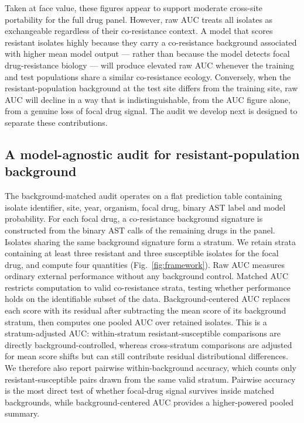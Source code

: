 \documentclass[11pt]{article}
\begin{document}
Taken at face value, these figures appear to support moderate cross-site portability for the full drug panel. However, raw AUC treats all isolates as exchangeable regardless of their co-resistance context. A model that scores resistant isolates highly because they carry a co-resistance background associated with higher mean model output --- rather than because the model detects focal drug-resistance biology --- will produce elevated raw AUC whenever the training and test populations share a similar co-resistance ecology. Conversely, when the resistant-population background at the test site differs from the training site, raw AUC will decline in a way that is indistinguishable, from the AUC figure alone, from a genuine loss of focal drug signal. The audit we develop next is designed to separate these contributions.

\subsection*{A model-agnostic audit for resistant-population background}

The background-matched audit operates on a flat prediction table containing isolate identifier, site, year, organism, focal drug, binary AST label and model probability. For each focal drug, a co-resistance background signature is constructed from the binary AST calls of the remaining drugs in the panel. Isolates sharing the same background signature form a stratum. We retain strata containing at least three resistant and three susceptible isolates for the focal drug, and compute four quantities (Fig.~\ref{fig:framework}). Raw AUC measures ordinary external performance without any background control. Matched AUC restricts computation to valid co-resistance strata, testing whether performance holds on the identifiable subset of the data. Background-centered AUC replaces each score with its residual after subtracting the mean score of its background stratum, then computes one pooled AUC over retained isolates. This is a stratum-adjusted AUC: within-stratum resistant-susceptible comparisons are directly background-controlled, whereas cross-stratum comparisons are adjusted for mean score shifts but can still contribute residual distributional differences. We therefore also report pairwise within-background accuracy, which counts only resistant-susceptible pairs drawn from the same valid stratum. Pairwise accuracy is the most direct test of whether focal-drug signal survives inside matched backgrounds, while background-centered AUC provides a higher-powered pooled summary.
\end{document}
